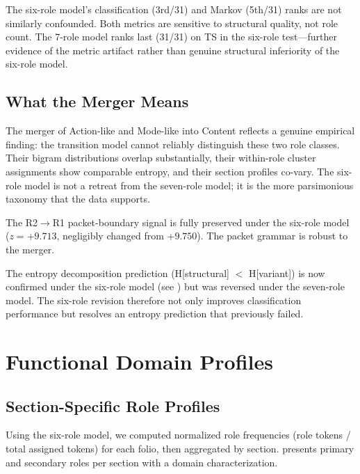 \documentclass[11pt,a4paper,twocolumn]{article}
\begin{document}
The six-role model's classification (3rd/31) and Markov (5th/31) ranks are not similarly confounded. Both metrics are sensitive to structural quality, not role count. The 7-role model ranks last (31/31) on TS in the six-role test---further evidence of the metric artifact rather than genuine structural inferiority of the six-role model.

\subsection{What the Merger Means}

The merger of Action-like and Mode-like into Content reflects a genuine empirical finding: the transition model cannot reliably distinguish these two role classes. Their bigram distributions overlap substantially, their within-role cluster assignments show comparable entropy, and their section profiles co-vary. The six-role model is not a retreat from the seven-role model; it is the more parsimonious taxonomy that the data supports.

The R2$\to$R1 packet-boundary signal is fully preserved under the six-role model ($z = +9.713$, negligibly changed from $+9.750$). The packet grammar is robust to the merger.

The entropy decomposition prediction (H[structural] $<$ H[variant]) is now confirmed under the six-role model (see ) but was reversed under the seven-role model. The six-role revision therefore not only improves classification performance but resolves an entropy prediction that previously failed.

\section{Functional Domain Profiles}
\label{sec:domains}

\subsection{Section-Specific Role Profiles}

Using the six-role model, we computed normalized role frequencies (role tokens / total assigned tokens) for each folio, then aggregated by section.  presents primary and secondary roles per section with a domain characterization.
\end{document}
